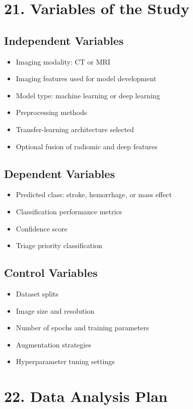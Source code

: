 \documentclass[12pt,a4paper]{report}
\begin{document}
\section{21. Variables of the Study}

\subsection{Independent Variables}

\begin{itemize}
\item Imaging modality: CT or MRI
\item Imaging features used for model development
\item Model type: machine learning or deep learning
\item Preprocessing methods
\item Transfer-learning architecture selected
\item Optional fusion of radiomic and deep features
\end{itemize}

\subsection{Dependent Variables}

\begin{itemize}
\item Predicted class: stroke, hemorrhage, or mass effect
\item Classification performance metrics
\item Confidence score
\item Triage priority classification
\end{itemize}

\subsection{Control Variables}

\begin{itemize}
\item Dataset splits
\item Image size and resolution
\item Number of epochs and training parameters
\item Augmentation strategies
\item Hyperparameter tuning settings
\end{itemize}


\section{22. Data Analysis Plan}
\end{document}
